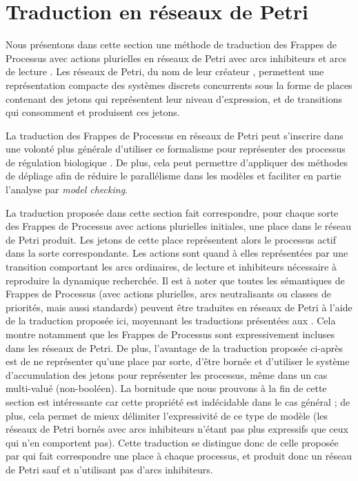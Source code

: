 
\section{Traduction en réseaux de Petri}

Nous présentons dans cette section une méthode de traduction des Frappes de Processus
avec actions plurielles en réseaux de Petri avec arcs inhibiteurs et arcs de lecture
\cite{Peterson77petrinets}.
Les réseaux de Petri, du nom de leur créateur ,
permettent une représentation compacte des systèmes discrets concurrents
sous la forme de places contenant des jetons qui représentent leur niveau d'expression,
et de transitions qui consomment et produisent ces jetons.

La traduction des Frappes de Processus en réseaux de Petri peut s'inscrire dans une volonté
plus générale d'utiliser ce formalisme pour représenter des processus de régulation
biologique \cite{Chaouiya07petrinet}.
De plus, cela peut permettre d'appliquer des méthodes de dépliage \cite{baldan00}
afin de réduire le parallélisme dans les modèles et faciliter en partie l'analyse
par \textit{model checking}.

La traduction proposée dans cette section fait correspondre, pour chaque sorte
des Frappes de Processus avec actions plurielles initiales, une place dans le réseau de Petri
produit.
Les jetons de cette place représentent alors le processus actif dans la sorte correspondante.
Les actions sont quand à elles représentées par une transition comportant les arcs ordinaires,
de lecture et inhibiteurs nécessaire à reproduire la dynamique recherchée.
Il est à noter que toutes les sémantiques de Frappes de Processus
(avec actions plurielles, arcs neutralisants ou classes de priorités,
mais aussi standards)
peuvent être traduites en réseaux de Petri à l'aide de la traduction proposée ici,
moyennant les traductions présentées aux .
Cela montre notamment que les Frappes de Processus sont expressivement incluses
dans les réseaux de Petri.
De plus, l'avantage de la traduction proposée ci-après est de ne représenter qu'une place
par sorte, d'être bornée
et d'utiliser le système d'accumulation des jetons pour représenter les processus,
même dans un cas multi-valué (non-booléen).
La bornitude que nous prouvons à la fin de cette section est intéressante car
cette propriété est indécidable dans le cas général \cite{Hack76} ;
de plus, cela permet de mieux délimiter l'expressivité de ce type de modèle
(les réseaux de Petri bornés avec arcs inhibiteurs n'étant pas plus expressifs
que ceux qui n'en comportent pas).
Cette traduction se distingue donc de celle proposée par 
qui fait correspondre une place à chaque processus,
et produit donc un réseau de Petri sauf et n'utilisant pas d'arcs inhibiteurs.


